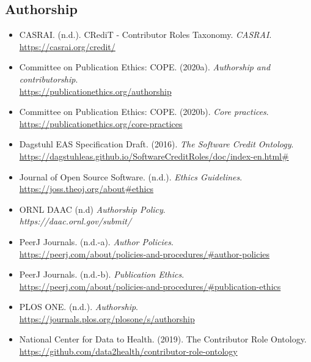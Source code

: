 \documentclass[11pt]{article}
\begin{document}
\vspace*{-2pt}
\subsection{Authorship}
\label{authorship}

\begin{itemize}

\item CASRAI. (n.d.). CRediT - Contributor Roles Taxonomy. \emph{CASRAI}.\\
\url{https://casrai.org/credit/}

\item Committee on Publication Ethics: COPE. (2020a). \emph{Authorship and contributorship}.\\
\url{https://publicationethics.org/authorship}

\item Committee on Publication Ethics: COPE. (2020b). \emph{Core practices}.\\
\url{https://publicationethics.org/core-practices}

\item Dagstuhl EAS Specification Draft. (2016). \emph{The Software Credit Ontology}.\\
\url{https://dagstuhleas.github.io/SoftwareCreditRoles/doc/index-en.html\#}

\item Journal of Open Source Software. (n.d.). \emph{Ethics Guidelines}.\\
\url{https://joss.theoj.org/about\#ethics}

\item ORNL DAAC (n.d) \emph{Authorship Policy}.\\
\emph{https://daac.ornl.gov/submit/}

\item PeerJ Journals. (n.d.-a). \emph{Author Policies}.\\
\url{https://peerj.com/about/policies-and-procedures/\#author-policies}

\item PeerJ Journals. (n.d.-b). \emph{Publication Ethics}.\\
\url{https://peerj.com/about/policies-and-procedures/\#publication-ethics}

\item PLOS ONE. (n.d.). \emph{Authorship}.\\
\url{https://journals.plos.org/plosone/s/authorship}

\item National Center for Data to Health. (2019). The Contributor Role Ontology.\\ 
\url{https://github.com/data2health/contributor-role-ontology}

\end{itemize}
\end{document}
